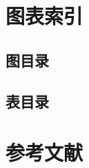 \newpage
\section{图表索引}
\subsection{图目录}
\listoffigures
\subsection{表目录}
\listoftables
\newpage
\section{参考文献}
\printbibliography[heading=bibintoc]